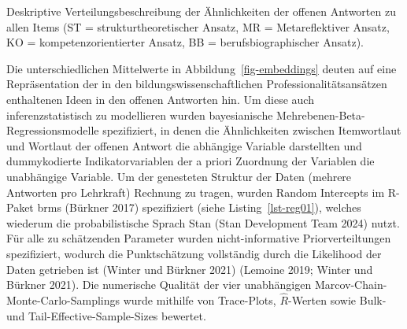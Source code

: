 \documentclass[
  letterpaper,
  DIV=11]{scrartcl}
\begin{document}
\begin{table}

\caption{\label{tbl-embeddings}Deskriptive Verteilungsbeschreibung der
Ähnlichkeiten der offenen Antworten zu allen Items (ST =
strukturtheoretischer Ansatz, MR = Metareflektiver Ansatz, KO =
kompetenzorientierter Ansatz, BB = berufsbiographischer Ansatz).}


\end{table}%

Die unterschiedlichen Mittelwerte in Abbildung~\ref{fig-embeddings}
deuten auf eine Repräsentation der in den bildungswissenschaftlichen
Professionalitätsansätzen enthaltenen Ideen in den offenen Antworten
hin. Um diese auch inferenzstatistisch zu modellieren wurden
bayesianische Mehrebenen-Beta-Regressionsmodelle spezifiziert, in denen
die Ähnlichkeiten zwischen Itemwortlaut und Wortlaut der offenen Antwort
die abhängige Variable darstellten und dummykodierte Indikatorvariablen
der a priori Zuordnung der Variablen die unabhängige Variable. Um der
genesteten Struktur der Daten (mehrere Antworten pro Lehrkraft) Rechnung
zu tragen, wurden Random Intercepts im R-Paket brms (Bürkner 2017)
spezifiziert (siehe Listing~\ref{lst-reg01}), welches wiederum die
probabilistische Sprach Stan (Stan Development Team 2024) nutzt. Für
alle zu schätzenden Parameter wurden nicht-informative
Priorverteiltungen spezifiziert, wodurch die Punktschätzung vollständig
durch die Likelihood der Daten getrieben ist (Winter und Bürkner 2021)
(Lemoine 2019; Winter und Bürkner 2021). Die numerische Qualität der
vier unabhängigen Marcov-Chain-Monte-Carlo-Samplings wurde mithilfe von
Trace-Plots, \(\hat{R}\)-Werten sowie Bulk- und
Tail-Effective-Sample-Sizes bewertet.
\end{document}
